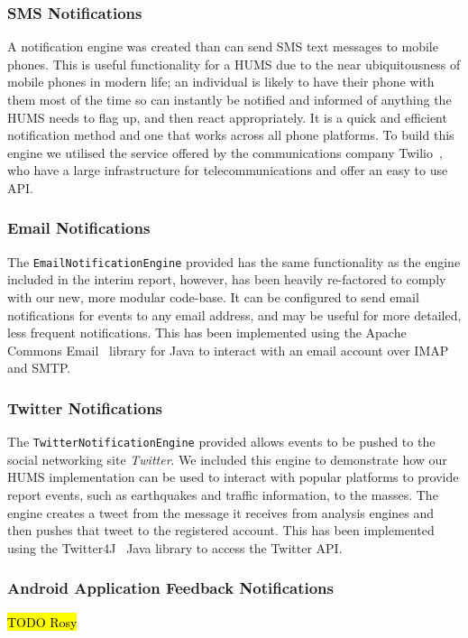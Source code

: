 \documentclass[10pt,a4paper]{article}
\begin{document}
\subsubsection{SMS Notifications}
A notification engine was created than can send SMS text messages to mobile phones. This is useful functionality for a HUMS due to the near ubiquitousness of mobile phones in modern life; an individual is likely to have their phone with them most of the time so can instantly be notified and informed of anything the HUMS needs to flag up, and then react appropriately. It is a quick and efficient notification method and one that works across all phone platforms. To build this engine we utilised the service offered by the communications company Twilio~\cite{twilio}, who have a large infrastructure for telecommunications and offer an easy to use API.

\subsubsection{Email Notifications}
The \texttt{EmailNotificationEngine} provided has the same functionality as the engine included in the interim report, however, has been heavily re-factored to comply with our new, more modular code-base.
It can be configured to send email notifications for events to any email address, and may be useful for more detailed, less frequent notifications. This has been implemented using the Apache Commons Email~\cite{ac_email} library for Java to interact with an email account over IMAP and SMTP.

\subsubsection{Twitter Notifications}
The \texttt{TwitterNotificationEngine} provided allows events to be pushed to the social networking site \emph{Twitter}. We included this engine to demonstrate how our HUMS implementation can be used to interact with popular platforms to provide report events, such as earthquakes and traffic information, to the masses. The engine creates a tweet from the message it receives from analysis engines and then pushes that tweet to the registered account. This has been implemented using the Twitter4J~\cite{twitter4j} Java library to access the Twitter API.

\subsubsection{Android Application Feedback Notifications}
\hl{TODO Rosy}
\end{document}
